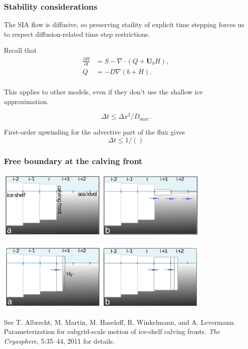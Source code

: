 \documentclass[hide notes,intlimits]{beamer}
\begin{document}
\begin{frame}
  \frametitle{Stability considerations}

  The SIA flow is diffusive, so preserving staility of explicit time
  stepping forces us to respect diffusion-related time step
  restrictions.

  Recall that
  \begin{align}
    \label{eq:2}
    \frac{\partial H}{\partial t} &= S - \nabla \cdot (Q + \mathbf{U}_b H),\\
    Q &= -D \nabla (b + H).\\
  \end{align}

  This applies to other models, even if they don't use the shallow ice
  approximation.

  \begin{equation}
    \label{eq:3}
    \Delta t \le \Delta x^{2} / D_{\text{max}}.
  \end{equation}

  First-order upwinding for the advective part of the flux gives
  \begin{equation}
    \label{eq:6}
    \Delta t \le 1 / ()
  \end{equation}
\end{frame}

\begin{frame}
  \frametitle{Free boundary at the calving front}

  \begin{center}
    \includegraphics[width=0.8\textwidth]{albrecht-martin-figure-1}

    \includegraphics[width=0.8\textwidth]{albrecht-martin-figure-2}
  \end{center}

  See T. Albrecht, M. Martin, M. Haseloff, R. Winkelmann, and A.
  Levermann. Parameterization for subgrid-scale motion of ice-shelf
  calving fronts. \emph{The Cryosphere}, 5:35–44, 2011 for details.
\end{frame}
\end{document}

